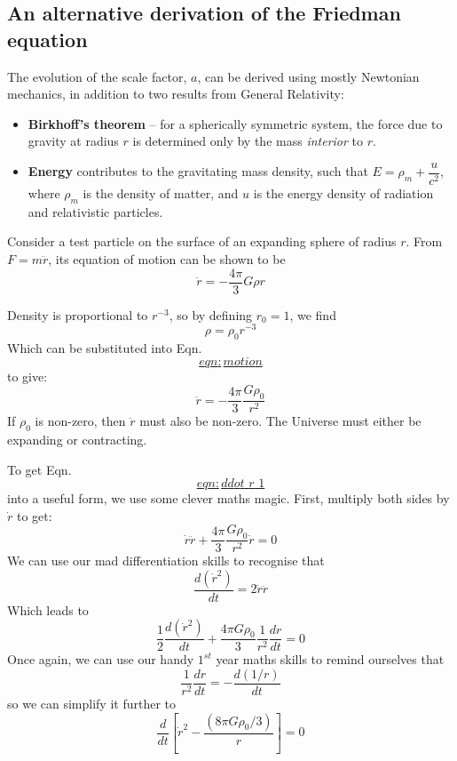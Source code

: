 \documentclass[11pt,a4paper,notoc]{tufte-handout}
\begin{document}
\hypertarget{sec:alt_friedman}{%
\subsection{An alternative derivation of the Friedman equation}\label{sec:alt_friedman}}

The evolution of the scale factor, \(a\), can be derived using mostly
Newtonian mechanics, in addition to two results from General Relativity:

\begin{itemize}
\item
  \textbf{Birkhoff's theorem} -- for a spherically symmetric system, the
  force due to gravity at radius \(r\) is determined only by the mass
  \emph{interior} to \(r\).
\item
  \textbf{Energy} contributes to the gravitating mass density, such that
  \(E = \rho_m + \dfrac{u}{c^2}\), where \(\rho_m\) is the density of
  matter, and \(u\) is the energy density of radiation and relativistic
  particles.
\end{itemize}

Consider a test particle on the surface of an expanding sphere of radius
\(r\). From \(F= m \ddot{r}\), its equation of motion can be shown to be
\[\label{eqn:motion}
    \ddot{r} = -\dfrac{4\pi}{3} G \rho r\]

Density is proportional to \(r^{-3}\), so by defining \(r_{0} = 1\), we find
\[\rho = \rho_{0}r^{-3}\] Which can be substituted into
Eqn.~\protect\hyperlink{eqn:motion}{\[eqn:motion\]} to give: \[\label{eqn:ddot_r_1}
    \ddot{r} = -\dfrac{4\pi}{3}\dfrac{G\rho_0}{r^2}\] If \(\rho_0\) is
non-zero, then \(\ddot{r}\) must also be non-zero. The Universe must
either be expanding or contracting.

To get Eqn.~\protect\hyperlink{eqn:ddot_r_1}{\[eqn:ddot\_r\_1\]} into a useful form, we use some clever maths
magic. First, multiply both sides by \(\dot{r}\) to get:
\[\dot{r}\ddot{r} + \dfrac{4\pi}{3}\dfrac{G\rho_{0}}{r^2}\dot{r} = 0\]
We can use our mad differentiation skills to recognise that
\[\dfrac{d(\dot{r}^2)}{dt} = 2\dot{r}\ddot{r}\] Which leads to
\[\dfrac{1}{2}\dfrac{d(\dot{r}^2)}{dt} + \dfrac{4\pi G \rho_0}{3} \dfrac{1}{r^2}\dfrac{dr}{dt} = 0\]
Once again, we can use our handy \(1^{st}\) year maths skills to remind
ourselves that \[\dfrac{1}{r^2}\dfrac{dr}{dt} = -\dfrac{d(1/r)}{dt}\] so
we can simplify it further to \[\label{ddot_r_2}
    \dfrac{d}{dt}\left[\dot{r}^2 - \dfrac{(8\pi G \rho_0 / 3)}{r}\right] = 0\]
\end{document}
